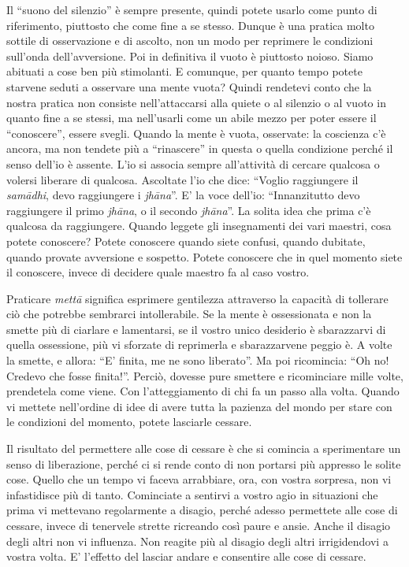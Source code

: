 Il ``suono del silenzio” è sempre presente, quindi potete usarlo come
punto di riferimento, piuttosto che come fine a se stesso. Dunque è una
pratica molto sottile di osservazione e di ascolto, non un modo per
reprimere le condizioni sull'onda dell'avversione. Poi in definitiva il
vuoto è piuttosto noioso. Siamo abituati a cose ben più stimolanti. E
comunque, per quanto tempo potete starvene seduti a osservare una mente
vuota? Quindi rendetevi conto che la nostra pratica non consiste
nell'attaccarsi alla quiete o al silenzio o al vuoto in quanto fine a se
stessi, ma nell'usarli come un abile mezzo per poter essere il
``conoscere'', essere svegli. Quando la mente è vuota, osservate: la
coscienza c'è ancora, ma non tendete più a ``rinascere'' in questa o
quella condizione perché il senso dell'io è assente. L'io si associa
sempre all'attività di cercare qualcosa o volersi liberare di qualcosa.
Ascoltate l'io che dice: ``Voglio raggiungere il \textit{samādhi}, devo
raggiungere i \textit{jhāna}''. E' la voce dell'io: ``Innanzitutto devo raggiungere
il primo \textit{jhāna}, o il secondo \textit{jhāna}''. La solita idea che prima c'è
qualcosa da raggiungere. Quando leggete gli insegnamenti dei vari
maestri, cosa potete conoscere? Potete conoscere quando siete confusi,
quando dubitate, quando provate avversione e sospetto. Potete conoscere
che in quel momento siete il conoscere, invece di decidere quale maestro
fa al caso vostro.

Praticare \textit{mettā} significa esprimere gentilezza attraverso la capacità di
tollerare ciò che potrebbe sembrarci intollerabile. Se la mente è
ossessionata e non la smette più di ciarlare e lamentarsi, se il vostro
unico desiderio è sbarazzarvi di quella ossessione, più vi sforzate di
reprimerla e sbarazzarvene peggio è. A volte la smette, e allora: ``E'
finita, me ne sono liberato''. Ma poi ricomincia: ``Oh no! Credevo che
fosse finita!''. Perciò, dovesse pure smettere e ricominciare mille
volte, prendetela come viene. Con l'atteggiamento di chi fa un passo
alla volta. Quando vi mettete nell'ordine di idee di avere tutta la
pazienza del mondo per stare con le condizioni del momento, potete
lasciarle cessare.

Il risultato del permettere alle cose di cessare è
che si comincia a sperimentare un senso di liberazione, perché ci si
rende conto di non portarsi più appresso le solite cose. Quello che un
tempo vi faceva arrabbiare, ora, con vostra sorpresa, non vi
infastidisce più di tanto. Cominciate a sentirvi a vostro agio in
situazioni che prima vi mettevano regolarmente a disagio, perché adesso
permettete alle cose di cessare, invece di tenervele strette ricreando
così paure e ansie. Anche il disagio degli altri non vi influenza. Non
reagite più al disagio degli altri irrigidendovi a vostra volta. E'
l'effetto del lasciar andare e consentire alle cose di cessare.

